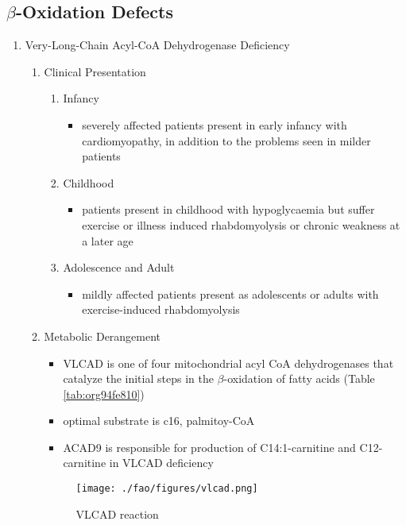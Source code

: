 \documentclass{scrartcl}
\begin{document}
\subsection{\(\beta\)-Oxidation Defects}
\label{sec:orgd79faee}
\begin{enumerate}
\item Very-Long-Chain Acyl-CoA Dehydrogenase Deficiency
\label{sec:orgfdd3ed8}
\begin{enumerate}
\item Clinical Presentation
\label{sec:org4be28ce}
\begin{enumerate}
\item Infancy
\label{sec:org5c7a8e1}
\begin{itemize}
\item severely affected patients present in early infancy with
cardiomyopathy, in addition to the problems seen in milder patients
\end{itemize}
\item Childhood
\label{sec:org1011c3d}
\begin{itemize}
\item patients present in childhood with hypoglycaemia but suffer exercise
or illness induced rhabdomyolysis or chronic weakness at a later age
\end{itemize}
\item Adolescence and Adult
\label{sec:org4620b72}
\begin{itemize}
\item mildly affected patients present as adolescents or adults with
exercise-induced rhabdomyolysis
\end{itemize}
\end{enumerate}
\item Metabolic Derangement
\label{sec:org65e543b}
\begin{itemize}
\item VLCAD is one of four mitochondrial acyl CoA dehydrogenases that
catalyze the initial steps in the \(\beta\)-oxidation of fatty acids
(Table \ref{tab:org94fe810})
\item optimal substrate is c16, palmitoy-CoA
\item ACAD9 is responsible for production of C14:1-carnitine and
C12-carnitine in VLCAD deficiency
\end{itemize}
\begin{figure}[htbp]
\centering
\texttt{[image: ./fao/figures/vlcad.png]}
\caption{\label{fig:org8a60a25}
VLCAD reaction}
\end{figure}


\end{enumerate}
\end{enumerate}
\end{document}
